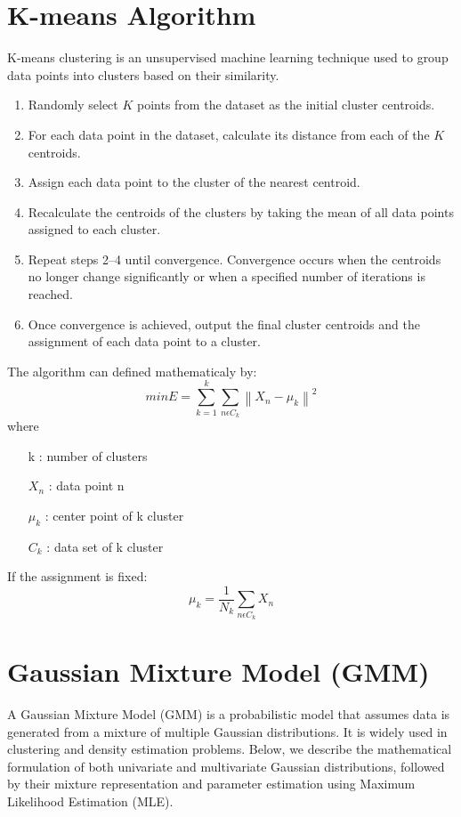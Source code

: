 \documentclass{article}
\begin{document}
\section*{K-means Algorithm}
K-means clustering is an unsupervised machine learning technique used to group data points into clusters based on their similarity.
\begin{enumerate}
    \item Randomly select \( K \) points from the dataset as the initial cluster centroids.
    \item For each data point in the dataset, calculate its distance from each of the \( K \) centroids.
    \item Assign each data point to the cluster of the nearest centroid.
    \item Recalculate the centroids of the clusters by taking the mean of all data points assigned to each cluster.
    \item Repeat steps 2–4 until convergence. Convergence occurs when the centroids no longer change significantly or when a specified number of iterations is reached.
    \item Once convergence is achieved, output the final cluster centroids and the assignment of each data point to a cluster.
\end{enumerate}
The algorithm can defined mathematicaly by:
\[
min E = \sum_{k=1}^{k} \sum_{n \epsilon C_k} \left\lVert X_n - \mu_k\right\rVert ^2
\]
where \begin{itemize}
    \item[k]: number of clusters
    \item[\(X_n\)]: data point n
    \item[\(\mu_k\)]: center point of k cluster
    \item[\(C_k\)]: data set of k cluster   
\end{itemize}
If the assignment is fixed:
\[
\mu_k = \frac{1}{N_k}\sum_{n \epsilon C_k}X_n
\]


\section*{Gaussian Mixture Model (GMM)}

A Gaussian Mixture Model (GMM) is a probabilistic model that assumes data is generated from a mixture of multiple Gaussian distributions. It is widely used in clustering and density estimation problems. Below, we describe the mathematical formulation of both univariate and multivariate Gaussian distributions, followed by their mixture representation and parameter estimation using Maximum Likelihood Estimation (MLE).
\end{document}
